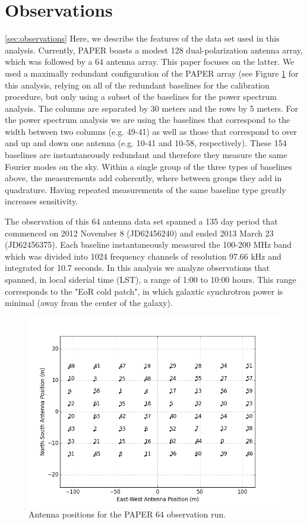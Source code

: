 \documentclass[twocolumn,numberedappendix]{emulateapj}
\begin{document}
\section{Observations}\ref{sec:observations}
Here, we describe the features of the data set used in this analysis. 
Currently, PAPER boasts a modest 128 dual-polarization antenna array, which was
followed by a 64 antenna array. This paper focuses on the latter.
We used a maximally redundant configuration of the PAPER array (see Figure
\ref{fig:antenna_positions} for this analysis, relying on all of the redundant
baselines for the calibration procedure, but only using a subset of the
baselines for the power spectrum analysis. The columns are separated by 30
meters and the rows by 5 meters. For the power spectrum analysis we
are using the baselines that correspond to the width between two columns (e.g.
49-41) as well as those that correspond to over and up and down one antenna
(e.g. 10-41 and 10-58, respectively). These 154 baselines are 
instantaneously redundant and therefore they measure the same Fourier modes on
the sky. Within a single group of the three types of baselines above, the
measurements add coherently, where between groups they add in quadrature. Having
repeated measurements of the same baseline type greatly increases sensitivity. 

The observation of this 64 antenna data set spanned a 135 day period that
commenced on 2012 November 8 (JD62456240) and ended  2013 March 23 (JD62456375). 
Each baseline instantaneously measured the 100-200 MHz band which was divided
into 1024 frequency channels of resolution 97.66 kHz and integrated for 10.7
seconds. In this analysis we analyze observations that spanned, in local
siderial time (LST), a range of 1:00 to 10:00 hours. This range corresponds to
the "EoR cold patch", in which galaxtic synchrotron power is minimal (away from
the center of the galaxy).

\begin{figure}[!t]\centering
\includegraphics[width=1.85\columnwidth]{plots/antenna_positions.png}
\caption{Antenna positions for the PAPER 64 observation run.}
\label{fig:antenna_positions}
\end{figure}
\end{document}
